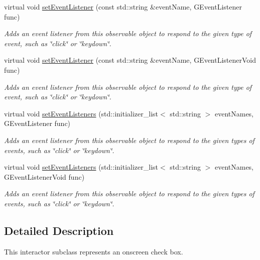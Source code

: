 \begin{DoxyCompactItemize}
virtual void \mbox{\hyperlink{classGObservable_ad2f6d34961c50f6c1e0659990b79f741}{set\+Event\+Listener}} (const std\+::string \&event\+Name, G\+Event\+Listener func)
\begin{DoxyCompactList}\small\item\em Adds an event listener from this observable object to respond to the given type of event, such as \char`\"{}click\char`\"{} or \char`\"{}keydown\char`\"{}. \end{DoxyCompactList}\item 
virtual void \mbox{\hyperlink{classGObservable_abac4cb9f9e626e010e87f5d91573c8a5}{set\+Event\+Listener}} (const std\+::string \&event\+Name, G\+Event\+Listener\+Void func)
\begin{DoxyCompactList}\small\item\em Adds an event listener from this observable object to respond to the given type of event, such as \char`\"{}click\char`\"{} or \char`\"{}keydown\char`\"{}. \end{DoxyCompactList}\item 
virtual void \mbox{\hyperlink{classGObservable_afa388d69c33c718cf035774604065604}{set\+Event\+Listeners}} (std\+::initializer\+\_\+list$<$ std\+::string $>$ event\+Names, G\+Event\+Listener func)
\begin{DoxyCompactList}\small\item\em Adds an event listener from this observable object to respond to the given types of events, such as \char`\"{}click\char`\"{} or \char`\"{}keydown\char`\"{}. \end{DoxyCompactList}\item 
virtual void \mbox{\hyperlink{classGObservable_a7867184bbb686f74fae8a4db927da799}{set\+Event\+Listeners}} (std\+::initializer\+\_\+list$<$ std\+::string $>$ event\+Names, G\+Event\+Listener\+Void func)
\begin{DoxyCompactList}\small\item\em Adds an event listener from this observable object to respond to the given types of events, such as \char`\"{}click\char`\"{} or \char`\"{}keydown\char`\"{}. \end{DoxyCompactList}\end{DoxyCompactItemize}


\subsection{Detailed Description}
This interactor subclass represents an onscreen check box. 

